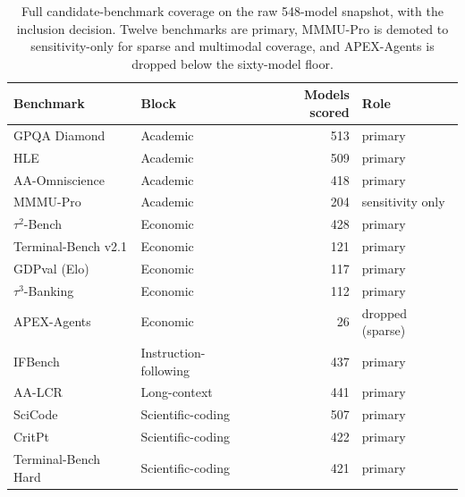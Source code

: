 \begin{table}[htbp]
\centering
\caption[Full candidate-benchmark coverage audit]{Full candidate-benchmark coverage on the raw 548-model snapshot, with the inclusion decision.
Twelve benchmarks are primary, MMMU-Pro is demoted to sensitivity-only for sparse and multimodal
coverage, and APEX-Agents is dropped below the sixty-model floor.}
\label{tab:coverage}
\small
\begin{tabular}{@{}llrl@{}}
\toprule
Benchmark & Block & Models scored & Role \\
\midrule
GPQA Diamond & Academic & 513 & primary \\
HLE & Academic & 509 & primary \\
AA-Omniscience & Academic & 418 & primary \\
MMMU-Pro & Academic & 204 & sensitivity only \\
$\tau^2$-Bench & Economic & 428 & primary \\
Terminal-Bench v2.1 & Economic & 121 & primary \\
GDPval (Elo) & Economic & 117 & primary \\
$\tau^3$-Banking & Economic & 112 & primary \\
APEX-Agents & Economic & 26 & dropped (sparse) \\
IFBench & Instruction-following & 437 & primary \\
AA-LCR & Long-context & 441 & primary \\
SciCode & Scientific-coding & 507 & primary \\
CritPt & Scientific-coding & 422 & primary \\
Terminal-Bench Hard & Scientific-coding & 421 & primary \\
\bottomrule
\end{tabular}
\end{table}